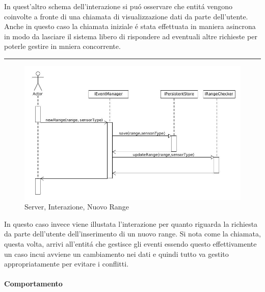 In quest'altro schema dell'interazione si pu\'o osservare che entit\'a vengono coinvolte a fronte di una chiamata di visualizzazione dati da parte dell'utente. Anche in questo caso la chiamata iniziale \'e stata effettuata in maniera asincrona in modo da lasciare il sistema libero di rispondere ad eventuali altre richieste per poterle gestire in mniera concorrente.

\noindent\rule[0.5ex]{\linewidth}{1pt}

\begin{figure}[h]
\centering
\includegraphics[width=\textwidth]{Figures/DomainModel/Server/NewRangeInteraction}
\caption{Server, Interazione, Nuovo Range}
\end{figure}

In questo caso invece viene illustata l'interazione per quanto riguarda la richiesta da parte dell'utente dell'inserimento di un nuovo range. Si nota come la chiamata, questa volta, arrivi all'entit\'a che gestisce gli eventi essendo questo effettivamente un caso incui avviene un cambiamento nei dati e quindi tutto va gestito appropriatamente per evitare i conflitti.

\paragraph{Comportamento}

